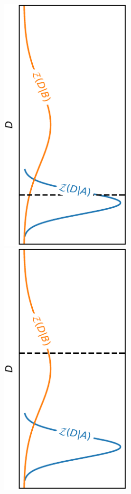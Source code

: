 \documentclass[aspectratio=169]{beamer}
\begin{document}
\begin{frame}
\begin{columns}
        \includegraphics[width=0.5\textwidth]{figures/sbi-0.pdf}%
        \includegraphics[width=0.5\textwidth]{figures/sbi-1.pdf}
    \end{columns}
\end{frame}
\end{document}

